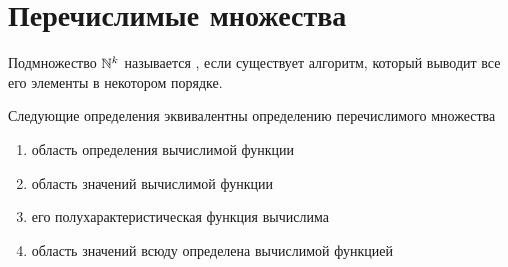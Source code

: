 \section{Перечислимые множества}

\begin{defn}
	Подмножество $ \mathbb{N}^{k}$ называется , если существует алгоритм, который выводит все его элементы в некотором порядке.
\end{defn}

\begin{thm}
    Следующие определения эквивалентны определению перечислимого множества
    \begin{enumerate}
	\item область определения вычислимой функции
	\item область значений вычислимой функции
	\item его полухарактеристическая функция вычислима
	\item область значений  всюду определена вычислимой функцией
    \end{enumerate} 
\end{thm}
